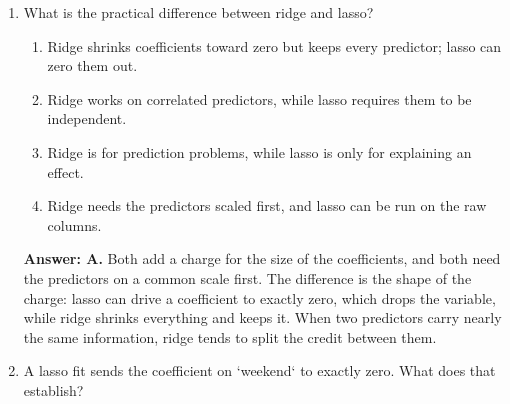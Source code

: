 \documentclass[11pt]{article}
\begin{document}
\begin{enumerate}[itemsep=14pt]
\begin{enumerate}[label=\Alph*., itemsep=1pt, topsep=3pt]
  \item Nothing at all, as long as every p-value in the final model is below 0.05.
  \item The p-values should have been computed before the final model was fitted.
  \item Each p-value assumes the variable was chosen in advance, and these won a search.
  \item Eleven predictors is too many for a model of this kind to be trustworthy.
\end{enumerate}

\vspace{2pt}
\textbf{Answer: C.} A p-value answers how often a result this strong would appear if the variable did nothing, and that question assumes you picked the variable without looking. Picking the best of 65 produces a strong-looking result either way, so the reported values understate how easily noise could have produced them.
\vspace{4pt}

\item What is the practical difference between ridge and lasso?

\begin{enumerate}[label=\Alph*., itemsep=1pt, topsep=3pt]
  \item Ridge shrinks coefficients toward zero but keeps every predictor; lasso can zero them out.
  \item Ridge works on correlated predictors, while lasso requires them to be independent.
  \item Ridge is for prediction problems, while lasso is only for explaining an effect.
  \item Ridge needs the predictors scaled first, and lasso can be run on the raw columns.
\end{enumerate}

\vspace{2pt}
\textbf{Answer: A.} Both add a charge for the size of the coefficients, and both need the predictors on a common scale first. The difference is the shape of the charge: lasso can drive a coefficient to exactly zero, which drops the variable, while ridge shrinks everything and keeps it. When two predictors carry nearly the same information, ridge tends to split the credit between them.
\vspace{4pt}

\item A lasso fit sends the coefficient on `weekend` to exactly zero. What does that establish?


\end{enumerate}
\end{document}
